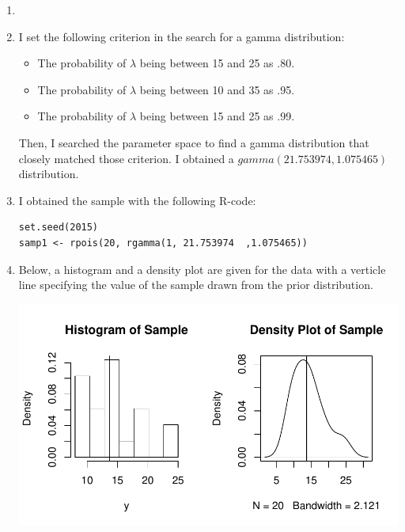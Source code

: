 \documentclass[12pt]{article}\usepackage[]{graphicx}\usepackage[]{color}
\makeatletter
\def\maxwidth{ %
  \ifdim\Gin@nat@width>\linewidth
    \linewidth
  \else
    \Gin@nat@width
  \fi
}
\newenvironment{knitrout}{}{} %
\makeatother
\begin{document}
\begin{enumerate}
\begin{enumerate}[label = (\alph*)]
\item

\item I set the following criterion in the search for a gamma distribution: 
\begin{itemize}
\item The probability of $\lambda$ being between 15 and 25 as .80.
\item The probability of $\lambda$ being between 10 and 35 as .95.
\item The probability of $\lambda$ being between 15 and 25 as .99.
\end{itemize}

Then, I searched the parameter space to find a gamma distribution that closely matched those criterion. I obtained a $gamma(21.753974  ,1.075465)$ distribution.

\item I obtained the sample with the following R-code:

\begin{verbatim}
set.seed(2015)
samp1 <- rpois(20, rgamma(1, 21.753974  ,1.075465))
\end{verbatim}

\item Below, a histogram and a density plot are given for the data with a verticle line specifying the value of the sample drawn from the prior distribution.

\begin{knitrout}
\color{fgcolor}

{\centering \includegraphics[width=\maxwidth]{figure/plot5f-1} 

}



\end{knitrout}


\end{enumerate}
\end{enumerate}
\end{document}
